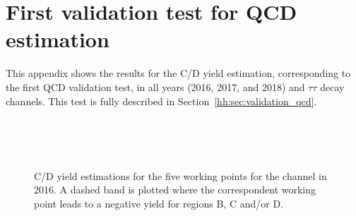 \documentclass[../main.tex]{subfiles}
\begin{document}
\chapter{First validation test for QCD estimation}
\label{appendix_b}

\renewcommand{\thefigure}{B.\arabic{figure}}

This appendix shows the results for the C/D yield estimation, corresponding to the first QCD validation test, in all years (2016, 2017, and 2018) and $\tau\tau$ decay channels. This test is fully described in Section~\ref{hh:sec:validation_qcd}.


\begin{figure}[h!]
    \begin{center}

    \\
    \\
    \\

    \caption[First validity test results for the QCD estimation for the \taumu\tauh{} channel in 2016]{C/D yield estimations for the five working points for the \taumu\tauh{} channel in 2016. A dashed band is plotted where the correspondent working point leads to a negative yield for regions B, C and/or D.}

    \end{center}
\end{figure}
\end{document}
